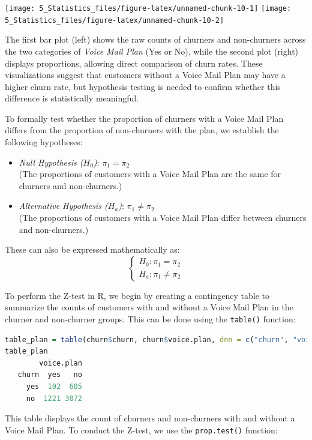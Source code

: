 \documentclass[
  11pt,
]{book}
\newcommand{\passthrough}[1]{#1}
\theoremstyle{definition}
\theoremstyle{definition}
\theoremstyle{definition}
\theoremstyle{definition}
\theoremstyle{remark}
\begin{document}
\texttt{[image: 5\_Statistics\_files/figure-latex/unnamed-chunk-10-1]} \texttt{[image: 5\_Statistics\_files/figure-latex/unnamed-chunk-10-2]}

The first bar plot (left) shows the raw counts of churners and non-churners across the two categories of \emph{Voice Mail Plan} (Yes or No), while the second plot (right) displays proportions, allowing direct comparison of churn rates. These visualizations suggest that customers without a Voice Mail Plan may have a higher churn rate, but hypothesis testing is needed to confirm whether this difference is statistically meaningful.

To formally test whether the proportion of churners with a Voice Mail Plan differs from the proportion of non-churners with the plan, we establish the following hypotheses:

\begin{itemize}
\item
  \emph{Null Hypothesis (\(H_0\))}: \(\pi_1 = \pi_2\)\\
  (The proportions of customers with a Voice Mail Plan are the same for churners and non-churners.)
\item
  \emph{Alternative Hypothesis (\(H_a\))}: \(\pi_1 \neq \pi_2\)\\
  (The proportions of customers with a Voice Mail Plan differ between churners and non-churners.)
\end{itemize}

These can also be expressed mathematically as:
\[
\begin{cases}
    H_0: \pi_1 = \pi_2   \\
    H_a: \pi_1 \neq \pi_2 
\end{cases}
\]

To perform the Z-test in R, we begin by creating a contingency table to summarize the counts of customers with and without a Voice Mail Plan in the churner and non-churner groups. This can be done using the \passthrough{\lstinline!table()!} function:

\begin{lstlisting}[language=R]
table_plan = table(churn$churn, churn$voice.plan, dnn = c("churn", "voice.plan"))
table_plan
        voice.plan
   churn  yes   no
     yes  102  605
     no  1221 3072
\end{lstlisting}

This table displays the count of churners and non-churners with and without a Voice Mail Plan. To conduct the Z-test, we use the \passthrough{\lstinline!prop.test()!} function:
\end{document}
